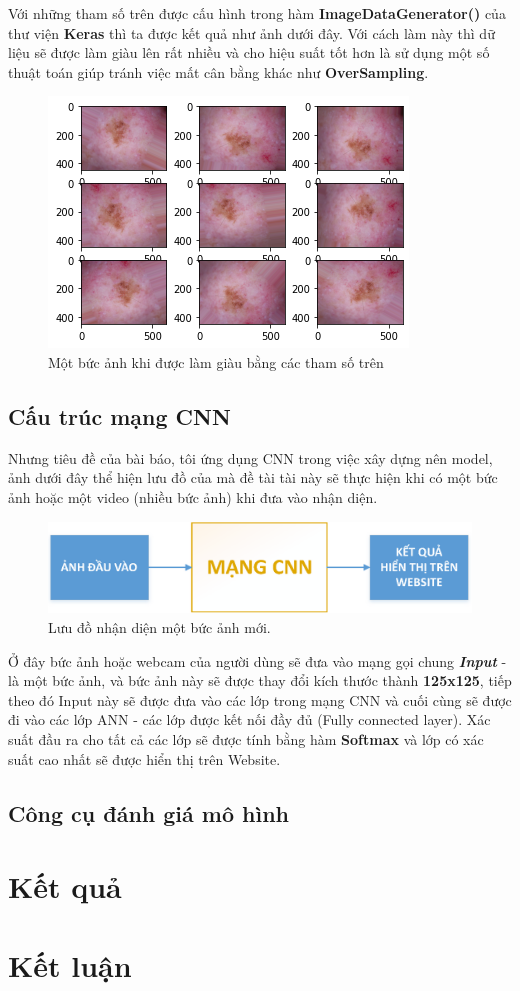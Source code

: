 \documentclass[12pt,a4paper]{article}
\begin{document}
	\noindent
	Với những tham số trên được cấu hình trong hàm \textbf{ImageDataGenerator()} của thư viện \textbf{Keras} thì ta được kết quả như ảnh dưới đây. Với cách làm này thì dữ liệu sẽ được làm giàu lên rất nhiều và cho hiệu suất tốt hơn là sử dụng một số thuật toán giúp tránh việc mất cân bằng khác như \textbf{OverSampling}.
	\begin{figure}[h!]
		\centering
		\includegraphics[width=0.5\linewidth]{./images/AnhLamGiau.png}
		\caption{Một bức ảnh khi được làm giàu bằng các tham số trên}
		\label{fig:AnhLamGiau}
	\end{figure}
	
	\subsection{Cấu trúc mạng CNN}
	
	Nhưng tiêu đề của bài báo, tôi ứng dụng CNN trong việc xây dựng nên model, ảnh dưới đây thể hiện lưu đồ của mà đề tài tài này sẽ thực hiện khi có một bức ảnh hoặc một video (nhiều bức ảnh) khi đưa vào nhận diện.
	
	\begin{figure}[h!]
		\centering
		\includegraphics[width=0.8\linewidth]{./images/soDo_1.eps}
		\caption{Lưu đồ nhận diện một bức ảnh mới.}
		\label{fig:soDo1}
	\end{figure}

	\noindent
	Ở đây bức ảnh hoặc webcam của người dùng sẽ đưa vào mạng gọi chung \textit{\textbf{Input}} - là một bức ảnh, và bức ảnh này sẽ được thay đổi kích thước thành \textbf{125x125}, tiếp theo đó Input này sẽ được đưa vào các lớp trong mạng CNN và cuối cùng sẽ được đi vào các lớp ANN - các lớp được kết nối đầy đủ (Fully connected layer). Xác suất đầu ra cho tất cả các lớp sẽ được tính bằng hàm \textbf{Softmax} và lớp có xác suất cao nhất sẽ được hiển thị trên Website.\\
	
	\noindent
	
	
	\subsection{Công cụ đánh giá mô hình}
	
	
	\section{Kết quả}
	
	
	\section{Kết luận}
\end{document}
